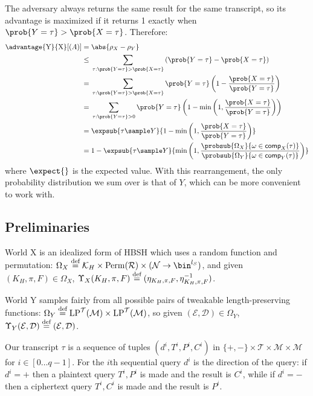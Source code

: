 \documentclass[eprint.tex]{subfiles}
\begin{document}
The adversary always returns the same result for the same transcript, so
its advantage is maximized if it returns 1 exactly when $\prob{Y = \tau} > \prob{X = \tau}$.
Therefore:
\begin{align*}
    \advantage{\textrm{Y}}{\textrm{X}}[(A)] ={}&
    \abs{\rho_X - \rho_Y} \\
    \leq {}& \sum_{\tau: \prob{Y = \tau} > \prob{X = \tau}}
    \left(\prob{Y = \tau} - \prob{X = \tau}\right) \\
    = {}& \sum_{\tau: \prob{Y = \tau} > \prob{X = \tau}}
    \prob{Y = \tau}\left(1 - \frac{\prob{X = \tau}}{\prob{Y = \tau}}\right) \\
    = {}& \sum_{\tau: \prob{Y = \tau} > 0}
    \prob{Y = \tau}\left(1 - \minone{\frac{\prob{X = \tau}}{\prob{Y = \tau}}}\right) \\
    = {}& \expsub{\tau \sample Y}{1 - \minone{
           \frac{\prob{X = \tau}}{\prob{Y = \tau}}
        }} \\
    = {}& 1 - \expsub{\tau \sample Y}{\minone{
           \frac{\probsub{\Omega_X}{\omega \in \comp_X(\tau)}}
           {\probsub{\Omega_Y}{\omega \in \comp_Y(\tau)}}
        }}
\end{align*}
where $\expect{}$ is the expected value.
With this rearrangement, the only probability distribution we sum over is that
of $Y$, which can be more convenient to work with.

\subsection{Preliminaries}
World X is
an idealized form of HBSH which uses a random function and permutation:
$\Omega_X \defeq \mathcal{K}_H \times \Perm(\mathcal{R}) \times (\mathcal{N} \rightarrow \bin^{l_S})$,
and given $(K_H, \pi, F) \in \Omega_X$,
$\Upsilon_X(K_H, \pi, F) \stackrel{\text{def}}{=} (\eta_{K_H, \pi, F}, \eta_{K_H, \pi, F}^{-1})$.

World Y samples fairly from all possible pairs of tweakable length-preserving functions:
$\Omega_Y \stackrel{\text{def}}{=} \operatorname{LP}^\mathcal{T}(\mathcal{M}) \times \operatorname{LP}^\mathcal{T}(\mathcal{M})$,
so given $(\mathcal{E}, \mathcal{D}) \in \Omega_Y$,
$\Upsilon_Y(\mathcal{E}, \mathcal{D}) \stackrel{\text{def}}{=} (\mathcal{E}, \mathcal{D})$.

Our transcript $\tau$ is a sequence of tuples
$(d^i, T^i, P^i, C^i)$
in
$\{+, -\} \times \mathcal{T} \times \mathcal{M} \times \mathcal{M}$
for $i \in [0 \ldots q-1]$.
For the $i$th sequential query
$d^i$ is the direction of the query:
if $d^i = +$ then a plaintext query $T^i, P^i$ is made and the result is $C^i$,
while if $d^i = -$ then a ciphertext query $T^i, C^i$ is made and the result is $P^i$.
\end{document}
